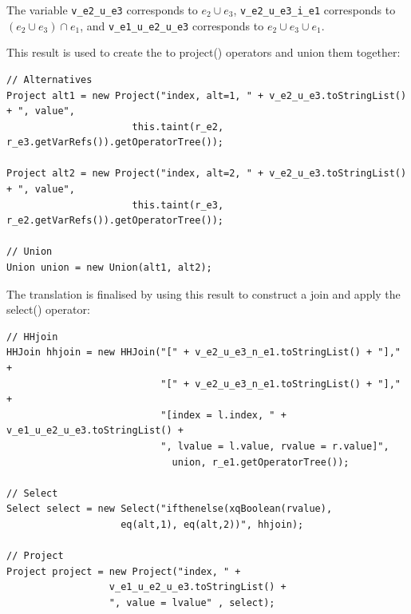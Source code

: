 The variable \texttt{v\_e2\_u\_e3} corresponds to $e_2 \cup e_3$, \texttt{v\_e2\_u\_e3\_i\_e1} corresponds to
$(e_2 \cup e_3) \cap e_1$, and \texttt{v\_e1\_u\_e2\_u\_e3} corresponds to $e_2 \cup e_3 \cup
e_1$.

This result is used to create the to \textsf{project()} operators and union
them together:

\begin{Verbatim}
// Alternatives
Project alt1 = new Project("index, alt=1, " + v_e2_u_e3.toStringList() + ", value", 
                      this.taint(r_e2, r_e3.getVarRefs()).getOperatorTree()); 

Project alt2 = new Project("index, alt=2, " + v_e2_u_e3.toStringList() + ", value", 
                      this.taint(r_e3, r_e2.getVarRefs()).getOperatorTree()); 

// Union
Union union = new Union(alt1, alt2);
\end{Verbatim}

The translation is finalised by using this result to construct a join and apply
the \textsf{select()} operator:

\begin{Verbatim}
// HHjoin
HHJoin hhjoin = new HHJoin("[" + v_e2_u_e3_n_e1.toStringList() + "]," +
                           "[" + v_e2_u_e3_n_e1.toStringList() + "]," + 
                           "[index = l.index, " + v_e1_u_e2_u_e3.toStringList() +
                           ", lvalue = l.value, rvalue = r.value]", 
                             union, r_e1.getOperatorTree());

// Select
Select select = new Select("ifthenelse(xqBoolean(rvalue), 
                    eq(alt,1), eq(alt,2))", hhjoin);

// Project
Project project = new Project("index, " + 
                  v_e1_u_e2_u_e3.toStringList() +
                  ", value = lvalue" , select);
\end{Verbatim}
